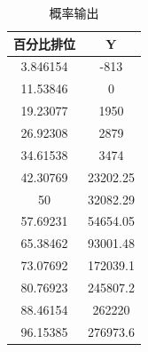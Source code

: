 \documentclass[12pt]{article}%
\begin{document}
\begin{table}[htbp]
  \centering
  \caption{概率输出}
    \begin{tabular}{cc}
    \hline
    百分比排位 & Y \bigstrut\\
    \hline
    3.846154 & -813 \bigstrut[t]\\
    11.53846 & 0 \\
    19.23077 & 1950 \\
    26.92308 & 2879 \\
    34.61538 & 3474 \\
    42.30769 & 23202.25 \\
    50 & 32082.29 \\
    57.69231 & 54654.05 \\
    65.38462 & 93001.48 \\
    73.07692 & 172039.1 \\
    80.76923 & 245807.2 \\
    88.46154 & 262220 \\
    96.15385 & 276973.6 \bigstrut[b]\\
    \hline
    \end{tabular}%
  \label{tab:addlabela2}%
\end{table}%
\end{document}
